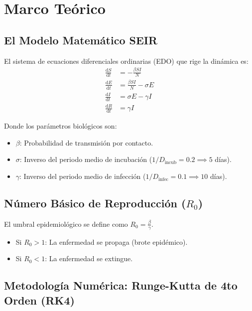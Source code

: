 \documentclass[12pt,a4paper]{article}
\theoremstyle{definition}
\newcommand{\dd}[2]{\frac{\mathrm{d}#1}{\mathrm{d}#2}}
\begin{document}
\section{Marco Te\'{o}rico}\label{sec:teoria}

\subsection{El Modelo Matem\'{a}tico SEIR}

El sistema de ecuaciones diferenciales ordinarias (EDO) que rige la din\'{a}mica es:
\begin{align}
\dd{S}{t} &= -\frac{\beta S I}{N} \label{eq:dS} \\
\dd{E}{t} &= \frac{\beta S I}{N} - \sigma E \label{eq:dE} \\
\dd{I}{t} &= \sigma E - \gamma I \label{eq:dI} \\
\dd{R}{t} &= \gamma I \label{eq:dR}
\end{align}

Donde los par\'{a}metros biol\'{o}gicos son:
\begin{itemize}
    \item $\beta$: Probabilidad de transmisi\'{o}n por contacto.
    \item $\sigma$: Inverso del periodo medio de incubaci\'{o}n ($1/D_{\text{incub}} = 0.2 \implies 5$ d\'{i}as).
    \item $\gamma$: Inverso del periodo medio de infecci\'{o}n ($1/D_{\text{infec}} = 0.1 \implies 10$ d\'{i}as).
\end{itemize}

\subsection{N\'{u}mero B\'{a}sico de Reproducci\'{o}n ($R_0$)}

El umbral epidemiol\'{o}gico se define como $R_0 = \frac{\beta}{\gamma}$. 
\begin{itemize}
    \item Si $R_0 > 1$: La enfermedad se propaga (brote epid\'{e}mico).
    \item Si $R_0 < 1$: La enfermedad se extingue.
\end{itemize}

\subsection{Metodolog\'{i}a Num\'{e}rica: Runge-Kutta de 4to Orden (RK4)}
\end{document}
